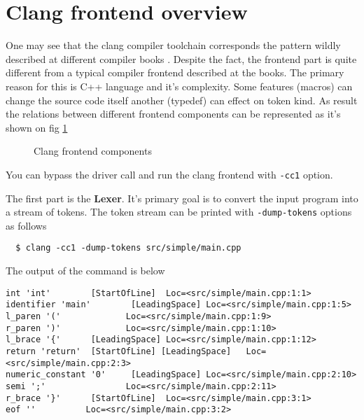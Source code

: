 \section{Clang frontend overview}
One may see that the clang compiler toolchain corresponds the pattern
wildly described at different compiler books
\cite{book:engineering_a_compiler}. Despite the fact, the frontend
part is quite different from a typical compiler frontend described at
the books. The primary reason for this is C++ language and it's
complexity. Some features (macros) can change the source code itself
another (typedef) can effect on token kind. As result the relations
between different frontend components can be represented as it's shown
on fig \ref{fig:clang_frontend}
\begin{figure}
\begin{center}
\end{center}
  \caption{Clang frontend components}
  \label{fig:clang_frontend}
\end{figure}

You can bypass the driver call and run the clang frontend  with
\texttt{-cc1} option. 

The first part is the \textbf{Lexer}. It's primary goal is to convert the input
program into a stream of tokens. The token stream can be printed with
\texttt{-dump-tokens} options as follows
\begin{verbatim}
  $ clang -cc1 -dump-tokens src/simple/main.cpp
\end{verbatim}
The output of the command is below
\begin{verbatim}
int 'int'        [StartOfLine]  Loc=<src/simple/main.cpp:1:1>
identifier 'main'        [LeadingSpace] Loc=<src/simple/main.cpp:1:5>
l_paren '('             Loc=<src/simple/main.cpp:1:9>
r_paren ')'             Loc=<src/simple/main.cpp:1:10>
l_brace '{'      [LeadingSpace] Loc=<src/simple/main.cpp:1:12>
return 'return'  [StartOfLine] [LeadingSpace]   Loc=<src/simple/main.cpp:2:3>
numeric_constant '0'     [LeadingSpace] Loc=<src/simple/main.cpp:2:10>
semi ';'                Loc=<src/simple/main.cpp:2:11>
r_brace '}'      [StartOfLine]  Loc=<src/simple/main.cpp:3:1>
eof ''          Loc=<src/simple/main.cpp:3:2>
\end{verbatim}

